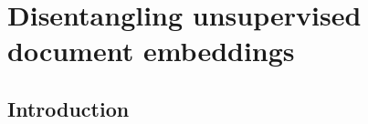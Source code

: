 \chapter{Disentangling unsupervised document embeddings}\label{ch3}


\section{Introduction}\label{chapter3:Introduction}














